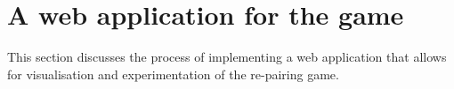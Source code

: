 \chapter{A web application for the game} This section discusses the process of implementing a web application that allows for visualisation and experimentation of the re-pairing game. 


